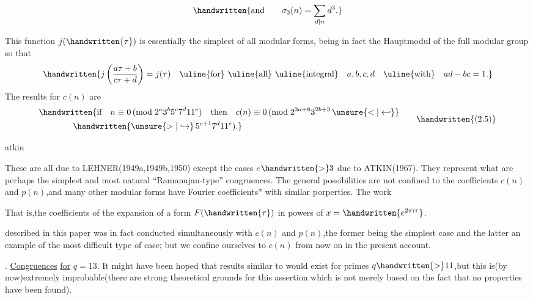 \[
\handwritten{\text{and}\qquad \sigma_{3}(n)=\sum_{d\mid n}d^{3}.}
\]

This function $j(\handwritten{\tau})$ is essentially the simplest of all modular forms, being in fact the Hauptmodul of the full modular group so that
\[
\handwritten{j\left(\frac{a\tau+b}{c\tau+d}\right)=j(\tau)\quad
\text{\uline{for} \uline{all} \uline{integral}}\quad a,b,c,d\quad
\text{\uline{with}}\quad ad-bc=1.}
\]
The results for $c(n)$ are
\[
\begin{aligned}
&\handwritten{\text{if}\quad n\equiv0\,(\mathrm{mod}\;2^{a}3^{b}5^{c}7^{d}11^{e})\quad
\text{then}\quad c(n)\equiv0\,(\mathrm{mod}\;2^{3a+8}3^{2b+3}\,\unsure{<|\hookleftarrow}}\\
&\hspace{4em}\handwritten{\unsure{>|\hookrightarrow}\,5^{c+1}7^{d}11^{e}).}
\end{aligned}
\tag*{\handwritten{(2.5)}}
\]

\noindent\hfill atkin 

\noindent These are all due to LEHNER(1949a,1949b,1950) except the cases \uline{$e$}$\handwritten{>}3$ due to ATKIN(1967). They represent what are perhaps the simplest and most natural ``Ramanujan-type'' congruences. The general possibilities are not confined to the coefficients \uline{$c(n)$} and \uline{$p(n)$},and many other modular forms have Fourier coefficients* with similar porperties. The work

\noindent\handwritten{\rule{\linewidth}{0.4pt}}

\noindent *That is,the coefficients of the expansion of a form $F(\handwritten{\tau})$ in powers of $x=\handwritten{e^{2\pi i\tau}}$.

\noindent\handwritten{\rule{\linewidth}{0.4pt}}

\noindent described in this paper was in fact conducted simultaneously with \uline{$c(n)$} and \uline{$p(n)$},the former being the simplest case and the latter an example of the most difficult type of case; but we confine ourselves to \uline{$c(n)$} from now on in the present account.

. \uline{Congruences} \uline{for} $q=13$. It might have been hoped that results similar to  would exist for primes $q\handwritten{>}11$,but this is(by now)extremely improbable(there are strong theoretical grounds for this assertion which is not merely based on the fact that no properties have been found).


